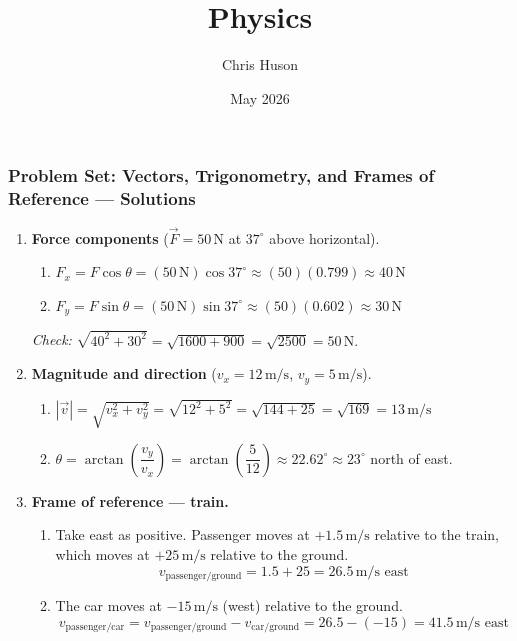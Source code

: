 \documentclass[12pt, twoside]{article}
\title{Physics}
\author{Chris Huson}
\date{May 2026}
\begin{document}
\subsubsection*{Problem Set: Vectors, Trigonometry, and Frames of Reference --- Solutions}

\begin{enumerate}

\item \textbf{Force components} ($\vec{F} = 50\,\text{N}$ at $37^\circ$ above horizontal).

\begin{enumerate}
\item $F_x = F\cos\theta = (50\,\text{N})\cos 37^\circ \approx (50)(0.799) \approx \boxed{40\,\text{N}}$

\item $F_y = F\sin\theta = (50\,\text{N})\sin 37^\circ \approx (50)(0.602) \approx \boxed{30\,\text{N}}$
\end{enumerate}

\emph{Check:} $\sqrt{40^2 + 30^2} = \sqrt{1600 + 900} = \sqrt{2500} = 50\,\text{N}.$ \checkmark

\vspace{0.8cm}

\item \textbf{Magnitude and direction} ($v_x = 12\,\text{m/s}$, $v_y = 5\,\text{m/s}$).

\begin{enumerate}
\item $|\vec{v}| = \sqrt{v_x^2 + v_y^2} = \sqrt{12^2 + 5^2} = \sqrt{144 + 25} = \sqrt{169} = \boxed{13\,\text{m/s}}$

\item $\theta = \arctan\!\left(\dfrac{v_y}{v_x}\right) = \arctan\!\left(\dfrac{5}{12}\right) \approx 22.62^\circ \approx \boxed{23^\circ}$ north of east.
\end{enumerate}

\vspace{0.8cm}

\item \textbf{Frame of reference --- train.}

\begin{enumerate}
\item Take east as positive. Passenger moves at $+1.5\,\text{m/s}$ relative to the train, which moves at $+25\,\text{m/s}$ relative to the ground.
\[
v_{\text{passenger/ground}} = 1.5 + 25 = \boxed{26.5\,\text{m/s east}}
\]

\item The car moves at $-15\,\text{m/s}$ (west) relative to the ground.
\[
v_{\text{passenger/car}} = v_{\text{passenger/ground}} - v_{\text{car/ground}} = 26.5 - (-15) = \boxed{41.5\,\text{m/s east}}
\]
\end{enumerate}


\end{enumerate}
\end{document}
